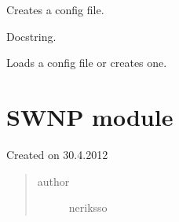 \documentclass[letterpaper,10pt,english]{sphinxmanual}
\begin{document}

\begin{fulllineitems}
\label{state:state.create_config}
Creates a config file.

\end{fulllineitems}


\begin{fulllineitems}
\label{state:state.initialization_test}
Docstring.

\end{fulllineitems}


\begin{fulllineitems}
\label{state:state.load_config}
Loads a config file or creates one.

\end{fulllineitems}



\section{SWNP module}
\label{swnp::doc}\label{swnp:swnp-module}\label{swnp:module-swnp}
Created on 30.4.2012
\begin{quote}\begin{description}
\item[{author}] \leavevmode
neriksso

\end{description}\end{quote}
\end{document}
